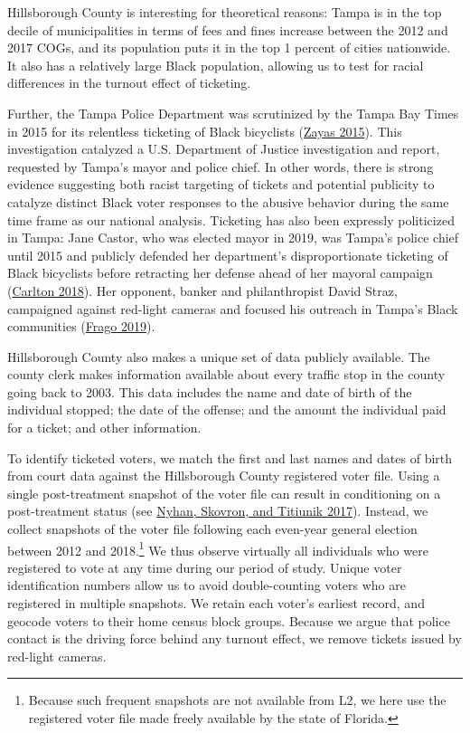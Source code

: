 \documentclass[
  12pt,
]{article}
\begin{document}
Hillsborough County is interesting for theoretical reasons: Tampa is in the top decile of municipalities in terms of fees and fines increase between the 2012 and 2017 COGs, and its population puts it in the top 1 percent of cities nationwide. It also has a relatively large Black population, allowing us to test for racial differences in the turnout effect of ticketing.

Further, the Tampa Police Department was scrutinized by the Tampa Bay Times in 2015 for its relentless ticketing of Black bicyclists (\protect\hyperlink{ref-Zayas2015}{Zayas 2015}). This investigation catalyzed a U.S. Department of Justice investigation and report, requested by Tampa's mayor and police chief. In other words, there is strong evidence suggesting both racist targeting of tickets and potential publicity to catalyze distinct Black voter responses to the abusive behavior during the same time frame as our national analysis. Ticketing has also been expressly politicized in Tampa: Jane Castor, who was elected mayor in 2019, was Tampa's police chief until 2015 and publicly defended her department's disproportionate ticketing of Black bicyclists before retracting her defense ahead of her mayoral campaign (\protect\hyperlink{ref-Carlton2018}{Carlton 2018}). Her opponent, banker and philanthropist David Straz, campaigned against red-light cameras and focused his outreach in Tampa's Black communities (\protect\hyperlink{ref-Frago2019}{Frago 2019}).

Hillsborough County also makes a unique set of data publicly available. The county clerk makes information available about every traffic stop in the county going back to 2003. This data includes the name and date of birth of the individual stopped; the date of the offense; and the amount the individual paid for a ticket; and other information.

To identify ticketed voters, we match the first and last names and dates of birth from court data against the Hillsborough County registered voter file. Using a single post-treatment snapshot of the voter file can result in conditioning on a post-treatment status (see \protect\hyperlink{ref-Nyhan2017}{Nyhan, Skovron, and Titiunik 2017}). Instead, we collect snapshots of the voter file following each even-year general election between 2012 and 2018.\footnote{Because such frequent snapshots are not available from L2, we here use the registered voter file made freely available by the state of Florida.} We thus observe virtually all individuals who were registered to vote at any time during our period of study. Unique voter identification numbers allow us to avoid double-counting voters who are registered in multiple snapshots. We retain each voter's earliest record, and geocode voters to their home census block groups. Because we argue that police contact is the driving force behind any turnout effect, we remove tickets issued by red-light cameras.
\end{document}
